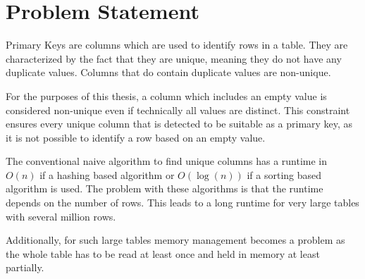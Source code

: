 \chapter{Problem Statement}\label{chap:problem_statement}
Primary Keys are columns which are used to identify rows in a table. They are characterized by the fact that they are unique, meaning they do not have any duplicate values. Columns that do contain duplicate values are non-unique.

For the purposes of this thesis, a column which includes an empty value is considered non-unique even if technically all values are distinct. This constraint ensures every unique column that is detected to be suitable as a primary key, as it is not possible to identify a row based on an empty value.

The conventional naive algorithm to find unique columns has a runtime in \(O(n)\) if a hashing based algorithm or \(O(\log(n))\) if a sorting based algorithm is used. The problem with these algorithms is that the runtime depends on the number of rows. This leads to a long runtime for very large tables with several million rows.

Additionally, for such large tables memory management becomes a problem as the whole table has to be read at least once and held in memory at least partially.
